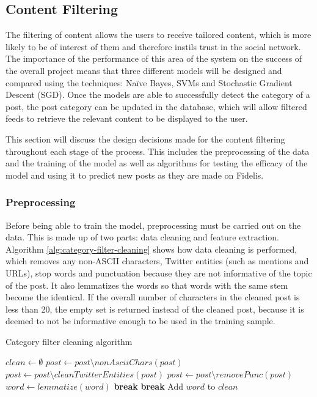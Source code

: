 \subsection{Content Filtering}
The filtering of content allows the users to receive tailored content, which is more likely to be of interest of them and therefore instils trust in the social network. The importance of the performance of this area of the system on the success of the overall project means that three different models will be designed and compared using the techniques: Na\"ive Bayes, SVMs and Stochastic Gradient Descent (SGD). Once the models are able to successfully detect the category of a post, the post category can be updated in the database, which will allow filtered feeds to retrieve the relevant content to be displayed to the user. 

This section will discuss the design decisions made for the content filtering throughout each stage of the process. This includes the preprocessing of the data and the training of the model as well as algorithms for testing the efficacy of the model and using it to predict new posts as they are made on Fidelis.

\subsubsection{Preprocessing}
Before being able to train the model, preprocessing must be carried out on the data. This is made up of two parts: data cleaning and feature extraction. Algorithm \ref{alg:category-filter-cleaning} shows how data cleaning is performed, which removes any non-ASCII characters, Twitter entities (such as mentions and URLs), stop words and punctuation because they are not informative of the topic of the post. It also lemmatizes the words so that words with the same stem become the identical. If the overall number of characters in the cleaned post is less than 20, the empty set is returned instead of the cleaned post, because it is deemed to not be informative enough to be used in the training sample.

\begin{algorithm}
\caption{Category filter cleaning algorithm}
\label{alg:category-filter-cleaning}
\begin{algorithmic}[1]
	\State $clean\gets \emptyset$
	\State $post\gets post\setminus nonAsciiChars(post)$ 
	\State $post\gets post\setminus cleanTwitterEntities(post)$
	\State $post\gets post\setminus removePunc(post)$
		\State $word\gets lemmatize(word)$
			\State \textbf{break} 
		\EndIf
			\State \textbf{break} 
		\EndIf
		\State Add $word$ to $clean$
	\EndFor
		\State \Return{$\emptyset$}
	\Else
		\State {}
	\EndIf
\EndFunction
\end{algorithmic}
\end{algorithm}

